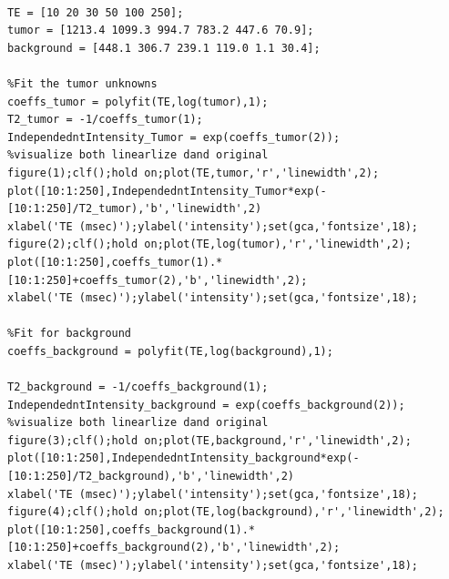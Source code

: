 \documentclass[12pt]{article}
\begin{document}
\begin{lstlisting}[style=Matlab-editor]
%Q4

TE = [10 20 30 50 100 250];
tumor = [1213.4 1099.3 994.7 783.2 447.6 70.9];
background = [448.1 306.7 239.1 119.0 1.1 30.4];

%Fit the tumor unknowns
coeffs_tumor = polyfit(TE,log(tumor),1);
T2_tumor = -1/coeffs_tumor(1);
IndependedntIntensity_Tumor = exp(coeffs_tumor(2));
%visualize both linearlize dand original
figure(1);clf();hold on;plot(TE,tumor,'r','linewidth',2);
plot([10:1:250],IndependedntIntensity_Tumor*exp(-[10:1:250]/T2_tumor),'b','linewidth',2)
xlabel('TE (msec)');ylabel('intensity');set(gca,'fontsize',18);
figure(2);clf();hold on;plot(TE,log(tumor),'r','linewidth',2);
plot([10:1:250],coeffs_tumor(1).*[10:1:250]+coeffs_tumor(2),'b','linewidth',2);
xlabel('TE (msec)');ylabel('intensity');set(gca,'fontsize',18);

%Fit for background
coeffs_background = polyfit(TE,log(background),1);

T2_background = -1/coeffs_background(1);
IndependedntIntensity_background = exp(coeffs_background(2));
%visualize both linearlize dand original
figure(3);clf();hold on;plot(TE,background,'r','linewidth',2);
plot([10:1:250],IndependedntIntensity_background*exp(-[10:1:250]/T2_background),'b','linewidth',2)
xlabel('TE (msec)');ylabel('intensity');set(gca,'fontsize',18);
figure(4);clf();hold on;plot(TE,log(background),'r','linewidth',2);
plot([10:1:250],coeffs_background(1).*[10:1:250]+coeffs_background(2),'b','linewidth',2);
xlabel('TE (msec)');ylabel('intensity');set(gca,'fontsize',18);


\end{lstlisting}
\end{document}
